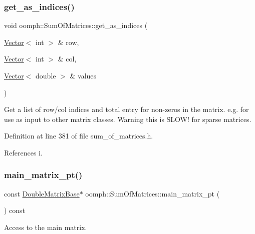 \subsubsection{\texorpdfstring{get\+\_\+as\+\_\+indices()}{get\_as\_indices()}}
{\footnotesize\ttfamily void oomph\+::\+Sum\+Of\+Matrices\+::get\+\_\+as\+\_\+indices (\begin{DoxyParamCaption}\item[{\hyperlink{classoomph_1_1Vector}{Vector}$<$ int $>$ \&}]{row,  }\item[{\hyperlink{classoomph_1_1Vector}{Vector}$<$ int $>$ \&}]{col,  }\item[{\hyperlink{classoomph_1_1Vector}{Vector}$<$ double $>$ \&}]{values }\end{DoxyParamCaption})\hspace{0.3cm}{\ttfamily [inline]}}



Get a list of row/col indices and total entry for non-\/zeros in the matrix. e.\+g. for use as input to other matrix classes. Warning this is S\+L\+O\+W! for sparse matrices. 



Definition at line 381 of file sum\+\_\+of\+\_\+matrices.\+h.



References i.

\mbox{\label{classoomph_1_1SumOfMatrices_a8e5bb86791c0d2b17703d45104e1d1ce}} 
\subsubsection{\texorpdfstring{main\+\_\+matrix\+\_\+pt()}{main\_matrix\_pt()}\hspace{0.1cm}{\footnotesize\ttfamily [1/2]}}
{\footnotesize\ttfamily const \hyperlink{classoomph_1_1DoubleMatrixBase}{Double\+Matrix\+Base}$\ast$ oomph\+::\+Sum\+Of\+Matrices\+::main\+\_\+matrix\+\_\+pt (\begin{DoxyParamCaption}{ }\end{DoxyParamCaption}) const\hspace{0.3cm}{\ttfamily [inline]}}



Access to the main matrix. 



